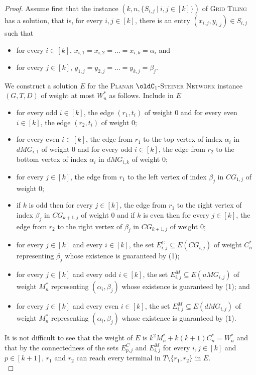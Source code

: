 \begin{proof}
Assume first that the instance $(k,n,\{S_{i,j}~|~i,j \in [k]\})$ of \textsc{Grid Tiling} has a solution, that is, for every $i,j \in [k]$, there is an entry $(x_{i,j},y_{i,j}) \in S_{i,j}$ such that
\begin{itemize}
\item for every $i \in [k]$, $x_{i,1} = x_{i,2} = \ldots = x_{i,k} = \alpha_i$ and
\item for every $j \in [k]$, $y_{1,j} = y_{2,j} = \ldots = y_{k,j} = \beta_j$.
\end{itemize}
We construct a solution $E$ for the \textsc{Planar $\oldC_1$-Steiner Network} instance $(G,T,D)$ of weight at most $W_n^*$ as follows. Include in $E$
\begin{itemize}
\item for every odd $i \in [k]$, the edge $(r_1,t_i)$ of weight 0 and for every even $i \in [k]$, the edge $(r_2,t_i)$ of weight 0;
\item for every even $i \in [k]$, the edge from $r_1$ to the top vertex of index $\alpha_i$ in $dMG_{i,1}$ of weight 0 and for every odd $i \in [k]$, the edge from $r_2$ to the bottom vertex of index $\alpha_i$ in $dMG_{i,k}$ of weight 0;  
\item for every $j \in [k]$, the edge from $r_1$ to the left vertex of index $\beta_j$ in $CG_{1,j}$ of weight 0;
\item if $k$ is odd then for every $j \in [k]$, the edge from $r_1$ to the right vertex of index $\beta_j$ in $CG_{k+1,j}$ of weight 0 and if $k$ is even then for every $j \in [k]$, the edge from $r_2$ to the right vertex of $\beta_j$ in $CG_{k+1,j}$ of weight 0;
\item for every $j \in [k]$ and every $i \in [k]$, the set $E^C_{i,j} \subseteq E(CG_{i,j})$ of weight $C_n^*$ representing $\beta_j$ whose existence is guaranteed by (1);
\item for every $j \in [k]$ and every odd $i \in [k]$, the set $E^M_{i,j} \subseteq E(uMG_{i,j})$ of weight $M_n^*$ representing $(\alpha_i,\beta_j)$ whose existence is guaranteed by (1); and
\item for every $j \in [k]$ and every even $i \in [k]$, the set $E^M_{i,j} \subseteq E(dMG_{i,j})$ of weight $M_n^*$ representing $(\alpha_i,\beta_j)$ whose existence is guaranteed by (1).
\end{itemize}
It is not difficult to see that the weight of $E$ is $k^2M_n^* + k(k+1)C_n^* = W_n^*$ and that by the connectedness of the sets $E^C_{p,j}$ and $E^M_{i,j}$ for every $i,j \in [k]$ and $p \in [k+1]$, $r_1$ and $r_2$ can reach every terminal in $T \setminus \{r_1,r_2\}$ in $E$.\\ 


\end{proof}
